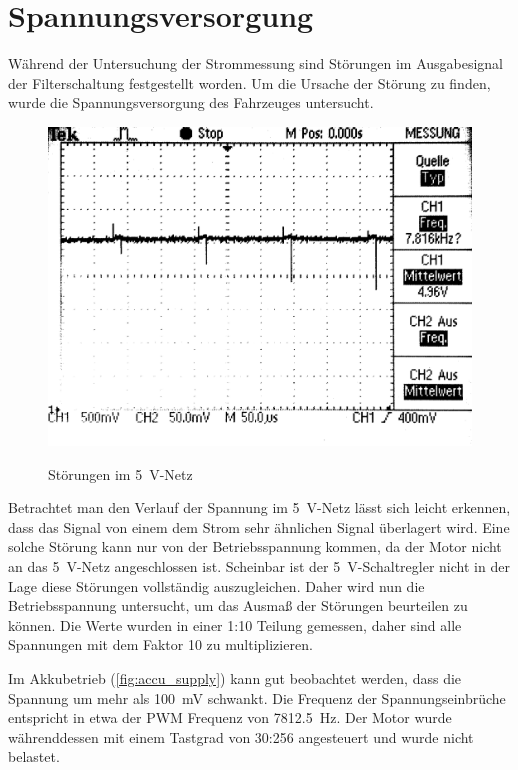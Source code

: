 \section{Spannungsversorgung}

Während der Untersuchung der Strommessung sind Störungen im Ausgabesignal der Filterschaltung festgestellt worden. Um die Ursache der Störung zu finden, wurde die Spannungsversorgung
des Fahrzeuges untersucht.

\begin{figure}[H]
\centering
\includegraphics[width=.8\textwidth]{5V_supply.png}\\
\caption{Störungen im \SI{5}{\V}-Netz}%
\label{fig:5V_Supply}
\end{figure}

Betrachtet man den Verlauf der Spannung im \SI{5}{\V}-Netz lässt sich leicht erkennen, dass das Signal von einem dem Strom sehr ähnlichen Signal überlagert wird.
Eine solche Störung kann nur von der Betriebsspannung kommen, da der Motor nicht an das \SI{5}{\V}-Netz angeschlossen ist. Scheinbar ist der \SI{5}{\V}-Schaltregler nicht in der
Lage diese Störungen vollständig auszugleichen.
Daher wird nun die Betriebsspannung untersucht, um das Ausmaß der Störungen beurteilen zu können.
Die Werte wurden in einer 1:10 Teilung gemessen, daher sind alle Spannungen mit dem Faktor 10 zu multiplizieren.

Im Akkubetrieb (\cref{fig:accu_supply}) kann gut beobachtet werden, dass die Spannung um mehr als \SI{100}{\mV} schwankt. Die Frequenz der Spannungseinbrüche entspricht in etwa
der PWM Frequenz von \SI{7812,5}{\hertz}.  Der Motor wurde währenddessen mit einem Tastgrad von 30:256 angesteuert und wurde nicht belastet.


